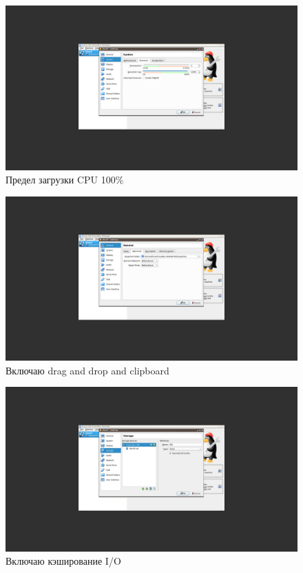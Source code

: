 \documentclass[a4paper]{article}
\begin{document}
\begin{figure}[H]
    \centering
    \includegraphics[width=\linewidth]{8.png}
    \caption{Предел загрузки CPU 100\%}
\end{figure}

\begin{figure}[H]
    \centering
    \includegraphics[width=\linewidth]{9.png}
    \caption{Включаю drag and drop and clipboard}
\end{figure}

\begin{figure}[H]
    \centering
    \includegraphics[width=\linewidth]{10-1.png}
    \caption{Включаю кэширование I/O}
\end{figure}
\end{document}
